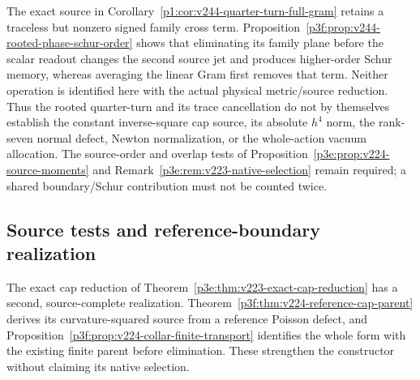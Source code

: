 \documentclass[12pt,a4paper]{article}
\begin{document}
\begin{remark}
\label{p3e:rem:v244-rooted-cap-overlap}
The exact source in Corollary~\ref{p1:cor:v244-quarter-turn-full-gram}
retains a traceless but nonzero signed family cross term.
Proposition~\ref{p3f:prop:v244-rooted-phase-schur-order} shows that
eliminating its family plane before the scalar readout changes the
second source jet and produces higher-order Schur memory, whereas
averaging the linear Gram first removes that term.  Neither operation
is identified here with the actual physical metric/source reduction.
Thus the rooted quarter-turn and its trace cancellation do not
by themselves establish the constant inverse-square cap source,
its absolute \(h^4\) norm, the rank-seven normal defect,
Newton normalization, or the whole-action vacuum allocation.
The source-order and overlap tests of
Proposition~\ref{p3e:prop:v224-source-moments} and
Remark~\ref{p3e:rem:v223-native-selection} remain required; a
shared boundary/Schur contribution must not be counted twice.
\end{remark}


\subsection{Source tests and reference-boundary realization}
\label{p3e:sec:v224-source-matching}
The exact cap reduction of Theorem~\ref{p3e:thm:v223-exact-cap-reduction}
has a second, source-complete realization. Theorem~\ref{p3f:thm:v224-reference-cap-parent}
derives its curvature-squared source from a reference Poisson defect,
and Proposition~\ref{p3f:prop:v224-collar-finite-transport} identifies
the whole form with the existing finite parent before elimination.
These strengthen the constructor without claiming its native selection.
\end{document}
